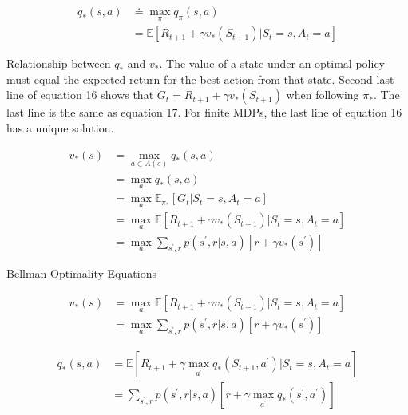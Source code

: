 \documentclass{article}
\begin{document}
\begin{equation}
\begin{aligned}
q_{*}(s, a) &\doteq \max _{\pi} q_{\pi}(s, a)\\
&= \mathbb{E}\left[R_{t+1}+\gamma v_{*}\left(S_{t+1}\right) | S_{t}=s, A_{t}=a\right]
\end{aligned}
\end{equation}

\noindent
Relationship between $q_{*}$ and $v_{*}$. The value of a state under an optimal
policy must equal the expected return for the best action from that state.
Second last line of equation 16 shows that $G_{t} = R_{t+1} + \gamma
v_{*}(S_{t+1})$ when following $\pi_{*}$. The last line is the same as equation
17. For finite MDPs, the last line of equation 16 has a unique solution.

\begin{equation}
\begin{aligned}
v_{*}(s) &=\max _{a \in A(s)} q_{*}(s, a)\\
&= \max _{a} q_{*}(s, a)\\
&= \max _{a} \mathbb{E}_{\pi_{*}}[G_{t} | S_{t} = s, A_{t} = a]\\
&= \max _{a} \mathbb{E}[R_{t+1} + \gamma v_{*}(S_{t+1}) | S_{t} = s, A_{t} = a]\\
&= \max _{a} \sum_{s^{\prime}, r} p(s^{\prime}, r | s, a)[r + \gamma v_{*}(s^{\prime})]
\end{aligned}
\end{equation}


\noindent
Bellman Optimality Equations

\begin{equation}
\begin{aligned}
v_{*}(s) & = \max _{a} \mathbb{E}\left[R_{t+1}+\gamma v_{*}\left(S_{t+1}\right) | S_{t}=s, A_{t}=a\right]\\
&= \max _{a} \sum_{s^{\prime}, r} p\left(s^{\prime}, r | s, a\right)\left[r+\gamma v_{*}\left(s^{\prime}\right)\right]
\end{aligned}
\end{equation}

\begin{equation}
\begin{aligned}
q_{*}(s, a)&=\mathbb{E}\left[R_{t+1}+\gamma \max _{a^{\prime}} q_{*}\left(S_{t+1}, a^{\prime}\right) | S_{t}=s, A_{t}=a\right] \\
&=\sum_{s^{\prime}, r} p\left(s^{\prime}, r | s, a\right)\left[r+\gamma \max _{a^{\prime}} q_{*}\left(s^{\prime}, a^{\prime}\right)\right]
\end{aligned}
\end{equation}
\end{document}
